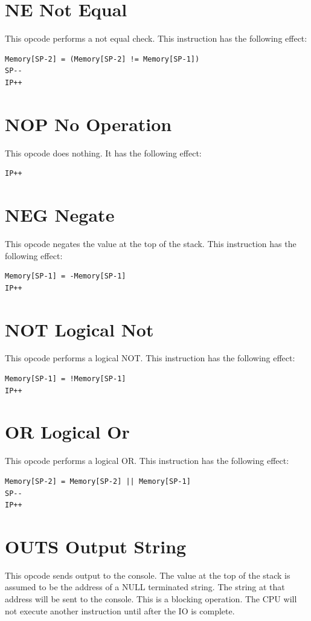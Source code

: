 \documentclass[11pt,a4paper,oneside]{book}
\begin{document}
\pagebreak
\section[NE]{\texorpdfstring{NE \hfill Not Equal}{NE -- Not Equal}}
This opcode performs a not equal check. This instruction has the following effect:
\begin{verbatim}
Memory[SP-2] = (Memory[SP-2] != Memory[SP-1])
SP--
IP++
\end{verbatim}

\pagebreak
\section[NOP]{\texorpdfstring{NOP \hfill No Operation}{NOP -- No Operation}}
This opcode does nothing. It has the following effect:
\begin{verbatim}
IP++
\end{verbatim}

\pagebreak
\section[NEG]{\texorpdfstring{NEG \hfill Negate}{NEG -- Negate}}
This opcode negates the value at the top of the stack. This instruction has the following effect:
\begin{verbatim}
Memory[SP-1] = -Memory[SP-1]
IP++
\end{verbatim}

\pagebreak
\section[NOT]{\texorpdfstring{NOT \hfill Logical Not}{NOT -- Logical Not}}
This opcode performs a logical NOT. This instruction has the following effect:
\begin{verbatim}
Memory[SP-1] = !Memory[SP-1]
IP++
\end{verbatim}

\pagebreak
\section[OR]{\texorpdfstring{OR \hfill Logical Or}{OR -- Logical Or}}
This opcode performs a logical OR. This instruction has the following effect:
\begin{verbatim}
Memory[SP-2] = Memory[SP-2] || Memory[SP-1]
SP--
IP++
\end{verbatim}

\pagebreak
\section[OUTS]{\texorpdfstring{OUTS \hfill Output String}{OUTS -- Output String}}
This opcode sends output to the console. The value at the top of the stack is assumed to be the
address of a NULL terminated string. The string at that address will be sent to the console. This is
a blocking operation. The CPU will not execute another instruction until after the IO is complete.
\end{document}
